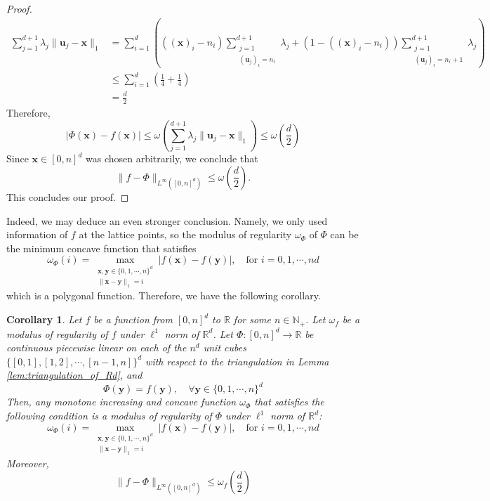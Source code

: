 \documentclass{article}
\numberwithin{equation}{section}
\newtheorem{corollary}{Corollary}[section]
\theoremstyle{definition}
\begin{document}
\begin{proof}
\begin{align*}
    \sum_{j=1}^{d+1}
    \lambda_j \| \mathbf{u}_j - \mathbf{x} \|_1 
    &= \sum_{i=1}^d \left(
       ((\mathbf{x})_i - n_i)
       \sum_{\substack{j=1 \\ (\mathbf{u}_j)_i = n_i}} ^ {d+1}  
       \lambda_j 
       +
       (1 - ((\mathbf{x})_i - n_i))
       \sum_{\substack{j=1 \\ (\mathbf{u}_j)_i = n_i + 1}} ^ {d+1}  
       \lambda_j 
       \right)  \\
    &\le \sum_{i=1}^d \left(
         \frac{1}{4} 
         +
         \frac{1}{4}
         \right)  \\
    &= \frac{d}{2}
\end{align*}
Therefore,
$$|\Phi(\mathbf{x}) - f(\mathbf{x}) |
\le \omega 
    \left( 
    \sum_{j=1}^{d+1}
    \lambda_j \| \mathbf{u}_j - \mathbf{x} \|_1  
    \right) 
\le \omega\left( \frac{d}{2} \right)$$
Since $\mathbf{x}\in[0,n]^d$ was chosen arbitrarily, we conclude that
\[
        \| f-\Phi \|_{L^{\infty}([0,n]^d)} 
    \le 
        \omega\left( \frac{d}{2} \right)
.
\]
This concludes our proof.
\end{proof}
Indeed, we may deduce an even stronger conclusion.  Namely, we only used information of $f$ at the lattice points, so the modulus of regularity $\omega_{\Phi}$ of $\Phi$ can be the minimum concave function that satisfies
$$\omega_{\Phi}(i) = 
\max\limits_
    {\substack{
        \mathbf{x},\mathbf{y}\in\{0,1,\cdots,n\}^d  \\
        \|\mathbf{x} - \mathbf{y}\|_1 = i  
        }
    }
|f(\mathbf{x}) - f(\mathbf{y})|,\quad \text{for } i=0,1,\cdots,nd$$
which is a polygonal function. Therefore, we have the following corollary.

\begin{corollary}
\label{cor:CPWLApprox_wRegControl_cor}
    Let $f$ be a function from $[0,n]^d$ to $\mathbb{R}$ for some $n\in\mathbb{N}_+$. Let $\omega_f$ be a modulus of regularity of $f$ under $\ell^1$ norm of $\mathbb{R}^d$. Let $\Phi:[0,n]^d\rightarrow\mathbb{R}$ be continuous piecewise linear on each of the $n^d$ unit cubes $\{[0,1],[1,2],\cdots,[n-1,n]\}^d$ with respect to the triangulation in Lemma \ref{lem:triangulation_of_Rd}, and
    $$\Phi(\mathbf{y}) = f(\mathbf{y}), \quad
    \forall \mathbf{y} \in\{0,1,\cdots,n\}^d$$
    Then, any monotone increasing and concave function $\omega_{\Phi}$ that satisfies the following condition is a modulus of regularity of $\Phi$ under $\ell^1$ norm of $\mathbb{R}^d$:
    $$\omega_{\Phi}(i) = 
    \max\limits_
    {\substack{
        \mathbf{x},\mathbf{y}\in\{0,1,\cdots,n\}^d  \\
        \|\mathbf{x} - \mathbf{y}\|_1 = i  
        }
    }
    |f(\mathbf{x}) - f(\mathbf{y})|,\quad 
    \text{for } i=0,1,\cdots,nd$$
    Moreover, 
    $$\| f-\Phi \|_{L^{\infty}([0,n]^d)} \le 
    \omega_f \left( \frac{d}{2} \right)$$
\end{corollary}
\end{document}
